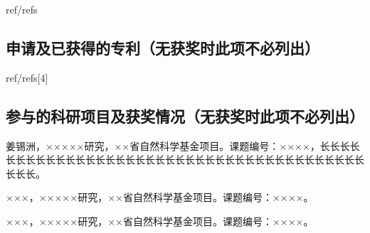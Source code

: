 \begin{resume}
  \begin{localref}{ref/refs}
    \nocite{zhangkun1994}
    \nocite{bixon1996dynamics}
    \nocite{kamiya2018nature}
  \end{localref}


  \subsection{申请及已获得的专利（无获奖时此项不必列出）}


  \begin{localref}{ref/refs}[4]
    \nocite{chenxu2020yejing}
    \nocite{jiangxizhou1980}
  \end{localref}

  \subsection{参与的科研项目及获奖情况（无获奖时此项不必列出）}
  \begin{achievements}[start=6]
    \item 姜锡洲，×××××研究，××省自然科学基金项目。课题编号：××××，长长长长长长长长长长长长长长长长长长长长长长长长长长长长长长长长长长长长长长长长长长长。
    \item ×××，×××××研究，××省自然科学基金项目。课题编号：××××。
    \item ×××，×××××研究，××省自然科学基金项目。课题编号：××××。
  \end{achievements}

\end{resume}
